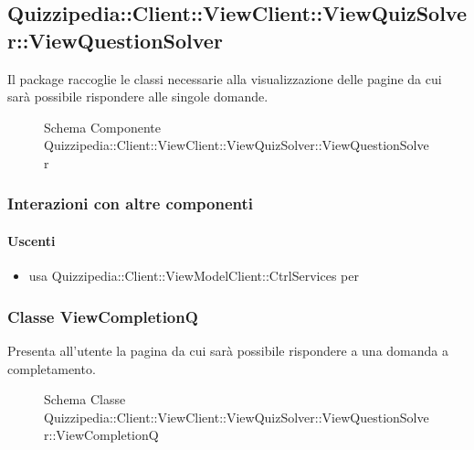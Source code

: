 \subsection{Quizzipedia::Client::ViewClient::ViewQuizSolver::ViewQuestionSolver}
Il package raccoglie le classi necessarie alla visualizzazione delle pagine da cui sarà possibile rispondere alle singole domande.
\begin{figure}[H]
\centering
\noindent{}
\caption[Schema Componente Quizzipedia::Client::ViewClient::ViewQuizSolver::ViewQuestionSolver]{Schema Componente Quizzipedia::Client::ViewClient::ViewQuizSolver::ViewQuestionSolver}
\end{figure}
\subsubsection{Interazioni con altre componenti}
\paragraph{Uscenti}
\begin{itemize}
\item usa Quizzipedia::Client::ViewModelClient::CtrlServices per 
\end{itemize}
\subsubsection{Classe ViewCompletionQ}
Presenta all'utente la pagina da cui sarà possibile rispondere a una domanda a completamento.
\begin{figure}[H]
\centering
\noindent{}
\caption[Schema Classe ViewCompletionQ]{Schema Classe Quizzipedia::Client::ViewClient::ViewQuizSolver::ViewQuestionSolver::ViewCompletionQ}
\end{figure}
